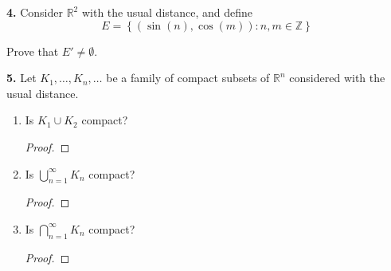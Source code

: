 \documentclass{article}
\newcommand{\R}{\mathbb{R}}
\newcommand{\Z}{\mathbb{Z}}
\newcommand{\set}[1]{\left\{ #1 \right\}}
\newcommand{\paren}[1]{\left( #1 \right)}
\begin{document}
\newpage %


\textbf{4. }
Consider $\R^2$ with the usual distance, and define
$$E = \set{\paren{\sin(n), \cos(m)} : n, m \in \Z}$$

Prove that $E' \ne \emptyset$.


\newpage %


\textbf{5. }
Let $K_1, \dots, K_n, \dots$ be a family of compact subsets of $\R^n$ considered with the usual distance.
\begin{enumerate}
    \item 
    Is $K_1 \cup K_2$ compact?
    \begin{proof}
        
    \end{proof}


    \item 
    Is $\bigcup_{n = 1}^\infty K_n$ compact?
    \begin{proof}
        
    \end{proof}


    \item 
    Is $\bigcap_{n = 1}^\infty K_n$ compact?
    \begin{proof}
        
    \end{proof}
\end{enumerate}

\end{document}
